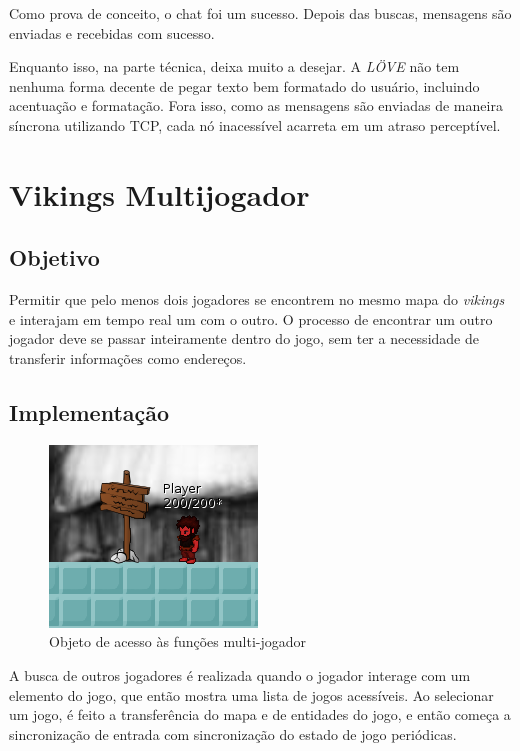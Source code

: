     Como prova de conceito, o chat foi um sucesso. Depois das buscas, mensagens são enviadas
    e recebidas com sucesso.
    
    Enquanto isso, na parte técnica, deixa muito a desejar. A \textit{LÖVE} não tem nenhuma
    forma decente de pegar texto bem formatado do usuário, incluindo acentuação e formatação.
    Fora isso, como as mensagens são enviadas de maneira síncrona utilizando TCP, cada nó
    inacessível acarreta em um atraso perceptível.
    
\section{Vikings Multijogador}
\label{sec:resultados:vikings}

  \subsection{Objetivo}
    Permitir que pelo menos dois jogadores se encontrem no mesmo mapa do \textit{vikings} e
    interajam em tempo real um com o outro. O processo de encontrar um outro jogador deve se
    passar inteiramente dentro do jogo, sem ter a necessidade de transferir informações como
    endereços.
    
  \subsection{Implementação}
    \begin{figure}[h]
      \centering
      \includegraphics{imagens/vikings-signpost.png}
      \caption{Objeto de acesso às funções multi-jogador}
    \end{figure}
    
    A busca de outros jogadores é realizada quando o jogador interage com um elemento do jogo,
    que então mostra uma lista de jogos acessíveis. Ao selecionar um jogo, é feito a transferência
    do mapa e de entidades do jogo, e então começa a sincronização de entrada com sincronização
    do estado de jogo periódicas.
    
